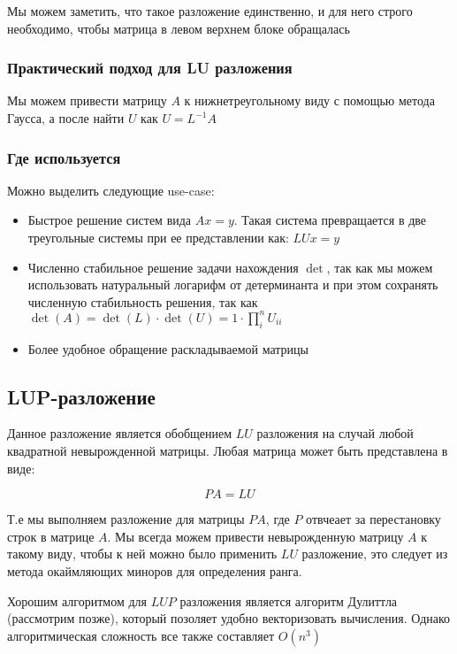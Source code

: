 \documentclass{article}
\begin{document}
    Мы можем заметить, что такое разложение единственно, и для него строго необходимо, чтобы матрица в левом верхнем блоке обращалась

    \subsubsection{Практический подход для LU разложения}

    Мы можем привести матрицу $A$ к нижнетреугольному виду с помощью метода Гаусса, а после найти $U$ как $U = L^{-1}A$


    \subsubsection{Где используется}

    Можно выделить следующие use-case: 

    \begin{itemize}
        \item Быстрое решение систем вида $Ax = y$. Такая система превращается в две треугольные системы при ее представлении как: $LUx = y$    
        \item Численно стабильное решение задачи нахождения $\det$, так как мы можем использовать натуральный логарифм от 
        детерминанта и при этом сохранять численную стабильность решения, так как $\det(A) = \det(L) \cdot \det(U) = 1 \cdot \prod_{i}^{n} U_{ii}$  
        \item Более удобное обращение раскладываемой матрицы
    \end{itemize}

    \subsection{LUP-разложение}

    Данное разложение является обобщением $LU$ разложения на случай любой квадратной невырожденной матрицы. Любая матрица может быть представлена в виде: 

    \begin{equation}
        PA = LU
    \end{equation}

    Т.е мы выполняем разложение для матрицы $PA$, где $P$ отвчеает за перестановку строк в матрице $A$. Мы всегда можем привести невырожденную матрицу $A$ к такому виду, чтобы 
    к ней можно было применить $LU$ разложение, это следует из метода окаймляющих миноров для определения ранга.

    Хорошим алгоритмом для $LUP$ разложения является алгоритм Дулиттла (рассмотрим позже), который позоляет удобно векторизовать вычисления. 
    Однако алгоритмическая сложность все также составляет $O(n^{3})$
 
\end{document}
